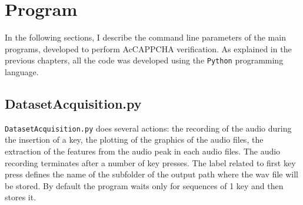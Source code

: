 \chapter{Program}\label{appendix:Program}
In the following sections, I describe the command line parameters of the main programs, developed to perform AcCAPPCHA verification. As explained in the previous chapters, all the code was developed using the \texttt{Python} programming language.

\section{DatasetAcquisition.py}
\texttt{DatasetAcquisition.py} does several actions: the recording of the audio during the insertion of a key, the plotting of the graphics of the audio files, the extraction of the features from the audio peak in each audio files. The audio recording terminates after a number of key presses. The label related to first key press defines the name of the subfolder of the output path where the wav file will be stored. By default the program waits only for sequences of 1 key and then stores it.


